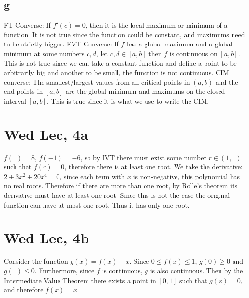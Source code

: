 \documentclass[12pt]{article}
\begin{document}
\subsection{g}
FT Converse: If $f'(c)=0$, then it is the local maximum or minimum of a function. It is not true since the function could be constant, and maximums need to be strictly bigger.
\newline
EVT Converse: If $f$ has a global maximum and a global minimum at some numbers $c,d$, let $c,d \in [a,b]$ then $f$ is continuous on $[a,b]$. This is not true since we can take a constant function and define a point to be arbitrarily big and another to be small, the function is not continuous.
\newline
CIM converse: The smallest/largest values from all critical points in $(a,b)$ and the end points in $[a,b]$ are the global minimum and maximums on the closed interval $[a,b]$. This is true since it is what we use to write the CIM.
\newpage


\section{Wed Lec, 4a}
$f(1)=8$, $f(-1)=-6$, so by IVT there must exist some number $r \in (1,1)$ such that $f(r)=0$, therefore there is at least one root.
\newline
We take the derivative: $2+3x^2+20x^4 = 0$, since each term with $x$ is non-negative, this polynomial has no real roots. Therefore if there are more than one root, by Rolle's theorem its derivative must have at least one root. Since this is not the case the original function can have at most one root.
\newline
Thus it has only one root.


\section{Wed Lec, 4b}
Consider the function $g(x) = f(x)-x$. Since $0 \leq f(x) \leq 1$, $g(0) \geq 0$ and $g(1) \leq 0$. Furthermore, since $f$ is continuous, $g$ is also continuous. Then by the Intermediate Value Theorem there exists a point in $[0,1]$ such that $g(x)=0$, and therefore $f(x)=x$
\end{document}
